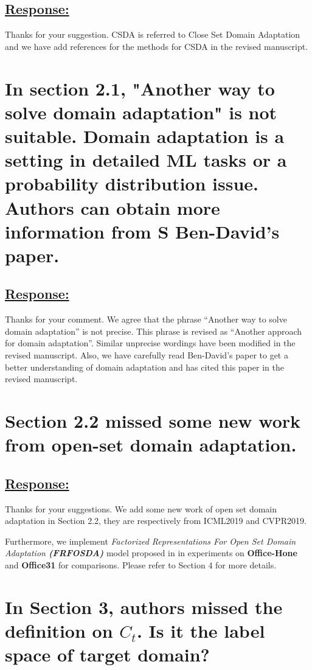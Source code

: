 \subsection*{\underline{\textbf{Response:}}}
Thanks for your suggestion.
CSDA is referred to Close Set Domain Adaptation and we have add references \cite{ben2010theory,Elsevier-DeepVisualDA,TransferLearningSurvey} for the methods for CSDA in the revised manuscript.

\section{In section 2.1, "Another way to solve domain adaptation" is not suitable.
Domain adaptation is a setting in detailed ML tasks or a probability distribution issue.
Authors can obtain more information from S Ben-David's paper.}
\subsection*{\underline{\textbf{Response:}}}
Thanks for your comment.
We agree that the phrase ``Another way to solve domain adaptation'' is not precise.
This phrase is revised as ``Another approach for domain adaptation''.
Similar unprecise wordings have been modified in the revised manuscript.
Also, we have carefully read Ben-David's paper \cite{ben2010theory} to get a better understanding of domain adaptation and has cited this paper in the revised manuscript.


\section{Section 2.2 missed some new work from open-set domain adaptation.}
\subsection*{\underline{\textbf{Response:}}}
Thanks for your suggestions.
We add some new work \cite{PDA-fac,PDA-sep} of open set domain adaptation in Section 2.2, they are respectively from ICML2019 and CVPR2019.

Furthermore, we implement \textit{Factorized Representations For Open Set Domain Adaptation \textbf{(FRFOSDA)}} model proposed in \cite{PDA-fac} in experiments on \textbf{Office-Hone} and \textbf{Office31} for comparisons.
Please refer to Section 4 for more details.

\section{In Section 3, authors missed the definition on $C_t$. Is it the label space of target domain?}
